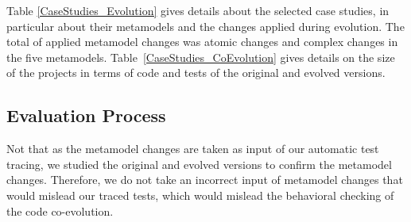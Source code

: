 Table \ref{CaseStudies_Evolution} gives details about the selected case studies, in particular about their metamodels and the changes applied during evolution. 
The total of applied metamodel changes was  atomic changes and  complex changes in the five metamodels.
%
Table~\ref{CaseStudies_CoEvolution} gives details on the size of the projects in terms of code and tests of the original and evolved versions. %


\subsection{Evaluation Process}

%
Not that as the metamodel changes are taken as input of our automatic test tracing, we studied the original and evolved versions to confirm the metamodel changes. Therefore, we do not take an incorrect input of metamodel changes that would mislead our traced tests, which would mislead the behavioral checking of the code co-evolution. 


